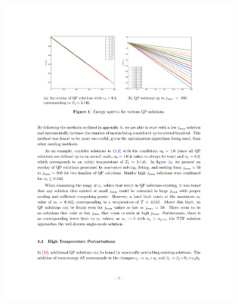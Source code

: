 \documentclass[mathserif,10pt]{beamer}
\begin{document}
{{  \vspace{-0.1in}
  \begin{columns}
  \begin{figure}
  \centering
  \includegraphics[scale=0.75]{largejmax} 
  \end{figure}
  \begin{figure}
  \centering

\end{figure}
\end{columns}}}
\end{document}
